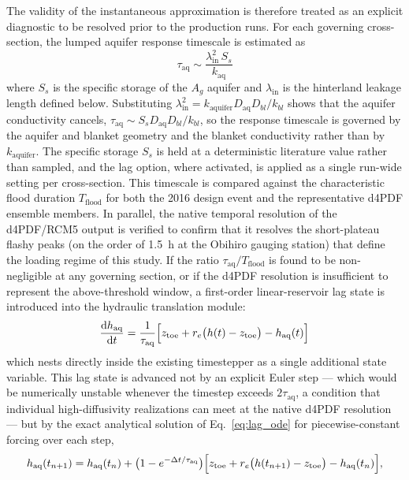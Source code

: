 The validity of the instantaneous approximation is therefore treated as an explicit
diagnostic to be resolved prior to the production runs. For each governing cross-section,
the lumped aquifer response timescale is estimated as
%
\begin{equation}
    \tau_\mathrm{aq} \sim \frac{\lambda_\mathrm{in}^{2}\, S_s}{k_\mathrm{aq}}
    \label{eq:tau_aq}
\end{equation}
%
where $S_s$ is the specific storage of the $A_g$ aquifer and $\lambda_\mathrm{in}$ is
the hinterland leakage length defined below. Substituting
$\lambda_\mathrm{in}^2 = k_\mathrm{aquifer} D_\mathrm{aq} D_{bl}/k_{bl}$ shows that the
aquifer conductivity cancels, $\tau_\mathrm{aq} \sim S_s D_\mathrm{aq} D_{bl}/k_{bl}$, so
the response timescale is governed by the aquifer and blanket geometry and the blanket
conductivity rather than by $k_\mathrm{aquifer}$. The specific storage $S_s$ is held at
a deterministic literature value rather than sampled, and the lag option, where
activated, is applied as a single run-wide setting per cross-section. This timescale is compared against the
characteristic flood duration $T_\mathrm{flood}$ for both the 2016 design event and the
representative d4PDF ensemble members. In parallel, the native temporal resolution of
the d4PDF/RCM5 output is verified to confirm that it resolves the short-plateau flashy
peaks (on the order of 1.5~h at the Obihiro gauging station) that define the loading
regime of this study. If the ratio $\tau_\mathrm{aq}/T_\mathrm{flood}$ is found to be
non-negligible at any governing section, or if the d4PDF resolution is insufficient to
represent the above-threshold window, a first-order linear-reservoir lag state is
introduced into the hydraulic translation module:
%
\begin{equation}
    \frac{\mathrm{d}h_\mathrm{aq}}{\mathrm{d}t}
    = \frac{1}{\tau_\mathrm{aq}}\Bigl[z_\mathrm{toe} + r_e\bigl(h(t) - z_\mathrm{toe}
    \bigr) - h_\mathrm{aq}(t)\Bigr]
    \label{eq:lag_ode}
\end{equation}
%
which nests directly inside the existing timestepper as a single additional state
variable. This lag state is advanced not by an explicit Euler step --- which would be
numerically unstable whenever the timestep exceeds $2\tau_\mathrm{aq}$, a condition that
individual high-diffusivity realizations can meet at the native d4PDF resolution --- but
by the exact analytical solution of Eq.~\eqref{eq:lag_ode} for piecewise-constant
forcing over each step,
$$h_\mathrm{aq}(t_{n+1}) = h_\mathrm{aq}(t_n) + \bigl(1 - e^{-\Delta t/\tau_\mathrm{aq}}\bigr)
\Bigl[z_\mathrm{toe} + r_e\bigl(h(t_{n+1}) - z_\mathrm{toe}\bigr) - h_\mathrm{aq}(t_n)\Bigr],$$
